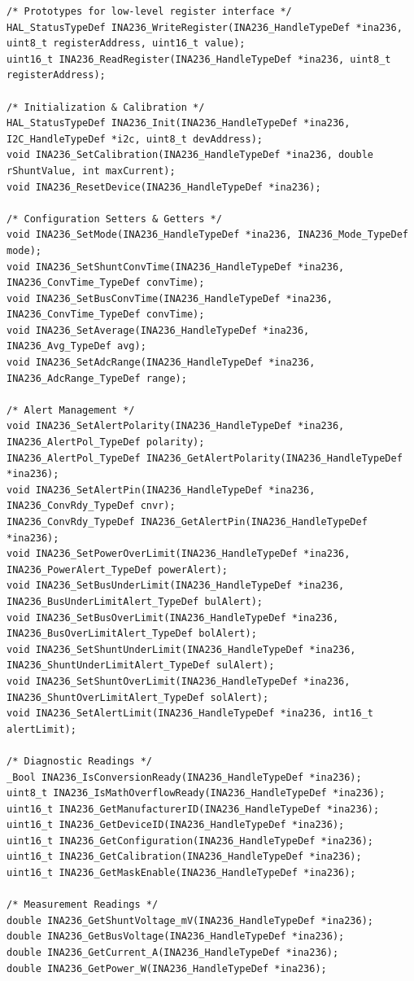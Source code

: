 \documentclass[
10pt, %
a4paper, %
oneside, %
headinclude,footinclude, %
BCOR5mm, %
]{scrartcl}
\begin{document}
\begin{lstlisting}[style=CMakeStyle]
/* Prototypes for low-level register interface */
HAL_StatusTypeDef INA236_WriteRegister(INA236_HandleTypeDef *ina236, uint8_t registerAddress, uint16_t value);
uint16_t INA236_ReadRegister(INA236_HandleTypeDef *ina236, uint8_t registerAddress);

/* Initialization & Calibration */
HAL_StatusTypeDef INA236_Init(INA236_HandleTypeDef *ina236, I2C_HandleTypeDef *i2c, uint8_t devAddress);
void INA236_SetCalibration(INA236_HandleTypeDef *ina236, double rShuntValue, int maxCurrent);
void INA236_ResetDevice(INA236_HandleTypeDef *ina236);

/* Configuration Setters & Getters */
void INA236_SetMode(INA236_HandleTypeDef *ina236, INA236_Mode_TypeDef mode);
void INA236_SetShuntConvTime(INA236_HandleTypeDef *ina236, INA236_ConvTime_TypeDef convTime);
void INA236_SetBusConvTime(INA236_HandleTypeDef *ina236, INA236_ConvTime_TypeDef convTime);
void INA236_SetAverage(INA236_HandleTypeDef *ina236, INA236_Avg_TypeDef avg);
void INA236_SetAdcRange(INA236_HandleTypeDef *ina236, INA236_AdcRange_TypeDef range);

/* Alert Management */
void INA236_SetAlertPolarity(INA236_HandleTypeDef *ina236, INA236_AlertPol_TypeDef polarity);
INA236_AlertPol_TypeDef INA236_GetAlertPolarity(INA236_HandleTypeDef *ina236);
void INA236_SetAlertPin(INA236_HandleTypeDef *ina236, INA236_ConvRdy_TypeDef cnvr);
INA236_ConvRdy_TypeDef INA236_GetAlertPin(INA236_HandleTypeDef *ina236);
void INA236_SetPowerOverLimit(INA236_HandleTypeDef *ina236, INA236_PowerAlert_TypeDef powerAlert);
void INA236_SetBusUnderLimit(INA236_HandleTypeDef *ina236, INA236_BusUnderLimitAlert_TypeDef bulAlert);
void INA236_SetBusOverLimit(INA236_HandleTypeDef *ina236, INA236_BusOverLimitAlert_TypeDef bolAlert);
void INA236_SetShuntUnderLimit(INA236_HandleTypeDef *ina236, INA236_ShuntUnderLimitAlert_TypeDef sulAlert);
void INA236_SetShuntOverLimit(INA236_HandleTypeDef *ina236, INA236_ShuntOverLimitAlert_TypeDef solAlert);
void INA236_SetAlertLimit(INA236_HandleTypeDef *ina236, int16_t alertLimit);

/* Diagnostic Readings */
_Bool INA236_IsConversionReady(INA236_HandleTypeDef *ina236);
uint8_t INA236_IsMathOverflowReady(INA236_HandleTypeDef *ina236);
uint16_t INA236_GetManufacturerID(INA236_HandleTypeDef *ina236);
uint16_t INA236_GetDeviceID(INA236_HandleTypeDef *ina236);
uint16_t INA236_GetConfiguration(INA236_HandleTypeDef *ina236);
uint16_t INA236_GetCalibration(INA236_HandleTypeDef *ina236);
uint16_t INA236_GetMaskEnable(INA236_HandleTypeDef *ina236);

/* Measurement Readings */
double INA236_GetShuntVoltage_mV(INA236_HandleTypeDef *ina236);
double INA236_GetBusVoltage(INA236_HandleTypeDef *ina236);
double INA236_GetCurrent_A(INA236_HandleTypeDef *ina236);
double INA236_GetPower_W(INA236_HandleTypeDef *ina236);
\end{lstlisting}
\end{document}
